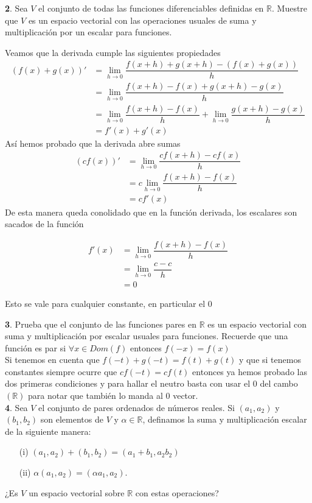 \documentclass[letterpaper]{article}
\newcommand{\R}{\mathds{R}}
\renewcommand{\*}{\cdot}
\theoremstyle{definition}
\begin{document}
 \noindent \textbf{2}. Sea $V$ el conjunto de todas las funciones diferenciables definidas en $\mathbb{R}$. Muestre que $V$ es un espacio vectorial con las operaciones usuales de suma y multiplicación por un escalar para funciones. 
	
	Veamos que la derivada cumple las siguientes propiedades
	\begin{align*}
	(f(x) + g(x))' &= \lim_{h\to 0} \dfrac{f(x +h) + g(x + h) - (f(x) + g(x))}{h}\\
	& = \lim_{h\to 0} \dfrac{f(x+h) - f(x) + g(x+h) - g(x)}{h}\\
	&= \lim_{h\to 0} \dfrac{f(x+h)-f(x)}{h} + \lim_{h\to 0} \dfrac{g(x+h)-g(x)}{h}\\
	&=f'(x) + g'(x)
	\end{align*}
	Así hemos probado que la derivada abre sumas
	\begin{align*}
	(cf(x))' &= \lim_{h\to 0} \dfrac{cf(x + h) - cf(x)}{h}\\
	& = c\lim_{h\to 0} \dfrac{f(x+h)-f(x)}{h}\\
	&= cf'(x)
	\end{align*}
	De esta manera queda conolidado que en la función derivada, los escalares son sacados de la función
	
	\begin{align*}
	f'(x) &= \lim_{h\to 0} \dfrac{f(x + h) - f(x)}{h}\\
	& = \lim_{h\to 0} \dfrac{c-c}{h}\\
	&= 0
	\end{align*}
	\begin{center}
		Esto se vale para cualquier constante, en particular el 0
	\end{center}
	
 \noindent \textbf{3}. Prueba que el conjunto de las funciones pares en $\mathbb{R}$ es un espacio vectorial con suma y multiplicación por escalar usuales para funciones. Recuerde que una función es par si $\forall x \in Dom(f)$ entonces $f(-x) = f(x)$ \\
 	
 	Si tenemos en cuenta que $f(-t) + g(-t) = f(t) + g(t)$ y que si tenemos constantes siempre ocurre que $cf(-t) = cf(t) $ entonces ya hemos probado las dos primeras condiciones y para hallar el neutro basta con usar el 0 del cambo $(\R)$ para notar que también lo manda al 0 vector.\\
 	
\noindent \textbf{4}. Sea $V$ el conjunto de pares ordenados de números reales. Si $(a_{1},a_{2})$ y $(b_{1},b_{2})$ son elementos de $V$ y $\alpha \in \mathbb{R}$, definamos la suma y multiplicación escalar de la siguiente manera:
\begin{enumerate}
\item[(i)] $(a_{1},a_{2}) + (b_{1},b_{2}) = (a_{1} + b_{1}, a_{2}b_{2})$ 
\item[(ii)] $\alpha(a_{1},a_{2}) = (\alpha a_{1},a_{2})$.\\
\end{enumerate}
¿Es $V$ un espacio vectorial sobre $\mathbb{R}$ con estas operaciones?\\
\end{document}
